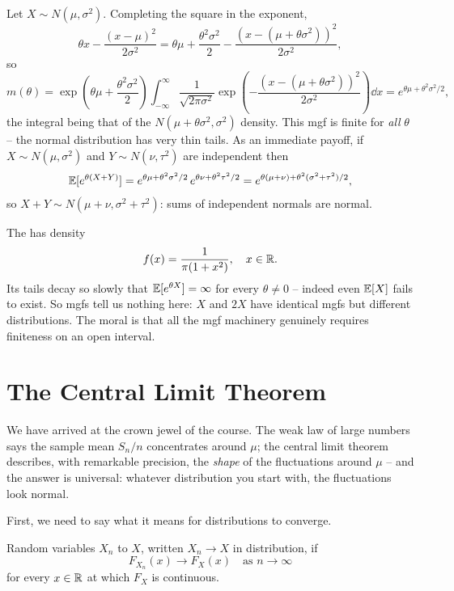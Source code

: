 \documentclass[a4paper]{scrartcl}
\begin{document}
\begin{example}
	Let $X \sim N(\mu, \sigma^2)$. Completing the square in the exponent,
	$$
	\theta x - \frac{(x - \mu)^2}{2\sigma^2} = \theta\mu + \frac{\theta^2\sigma^2}{2} - \frac{\left(x - (\mu + \theta\sigma^2)\right)^2}{2\sigma^2},
	$$
	so
	$$
	m(\theta) = \exp\left(\theta\mu + \frac{\theta^2\sigma^2}{2}\right)\int_{-\infty}^{\infty} \frac{1}{\sqrt{2\pi\sigma^2}}\exp\left(-\frac{(x - (\mu + \theta\sigma^2))^2}{2\sigma^2}\right)\dd x = e^{\theta\mu + \theta^2\sigma^2/2},
	$$
	the integral being that of the $N(\mu + \theta\sigma^2, \sigma^2)$ density. This mgf is finite for \emph{all} $\theta$ -- the normal distribution has very thin tails. As an immediate payoff, if $X \sim N(\mu, \sigma^2)$ and $Y \sim N(\nu, \tau^2)$ are independent then
	$$
	\mathbb{E}[e^{\theta(X + Y)}] = e^{\theta\mu + \theta^2\sigma^2/2}\, e^{\theta\nu + \theta^2\tau^2/2} = e^{\theta(\mu + \nu) + \theta^2(\sigma^2 + \tau^2)/2},
	$$
	so $X + Y \sim N(\mu + \nu, \sigma^2 + \tau^2)$: sums of independent normals are normal.
\end{example}

\begin{example}
	The  has density
	$$
	f(x) = \frac{1}{\pi(1 + x^2)}, \quad x \in \mathbb{R}.
	$$
	Its tails decay so slowly that $\mathbb{E}[e^{\theta X}] = \infty$ for every $\theta \neq 0$ -- indeed even $\mathbb{E}[X]$ fails to exist. So mgfs tell us nothing here: $X$ and $2X$ have identical mgfs but different distributions. The moral is that all the mgf machinery genuinely requires finiteness on an open interval.
\end{example}

\section{The Central Limit Theorem}

We have arrived at the crown jewel of the course. The weak law of large numbers says the sample mean $S_n / n$ concentrates around $\mu$; the central limit theorem describes, with remarkable precision, the \emph{shape} of the fluctuations around $\mu$ -- and the answer is universal: whatever distribution you start with, the fluctuations look normal.

First, we need to say what it means for distributions to converge.

\begin{definition}
	Random variables $X_n$  to $X$, written $X_n \rightarrow X$ in distribution, if
	$$
	F_{X_n}(x) \longrightarrow F_X(x) \quad \text{as } n \rightarrow \infty
	$$
	for every $x \in \mathbb{R}$ at which $F_X$ is continuous.
\end{definition}
\end{document}
